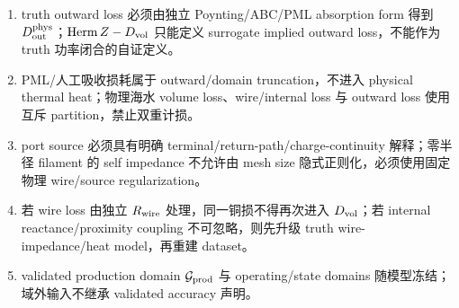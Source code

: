 \begin{enumerate}
  \item truth outward loss 必须由独立 Poynting/ABC/PML absorption form 得到 $D_{\rm out}^{\rm phys}$；$\operatorname{Herm}Z-D_{\rm vol}$ 只能定义 surrogate implied outward loss，不能作为 truth 功率闭合的自证定义。
  \item PML/人工吸收损耗属于 outward/domain truncation，不进入 physical thermal heat；物理海水 volume loss、wire/internal loss 与 outward loss 使用互斥 partition，禁止双重计损。
  \item port source 必须具有明确 terminal/return-path/charge-continuity 解释；零半径 filament 的 self impedance 不允许由 mesh size 隐式正则化，必须使用固定物理 wire/source regularization。
  \item 若 wire loss 由独立 $R_{\rm wire}$ 处理，同一铜损不得再次进入 $D_{\rm vol}$；若 internal reactance/proximity coupling 不可忽略，则先升级 truth wire-impedance/heat model，再重建 dataset。
  \item validated production domain $\mathcal G_{\rm prod}$ 与 operating/state domains 随模型冻结；域外输入不继承 validated accuracy 声明。


\end{enumerate}

